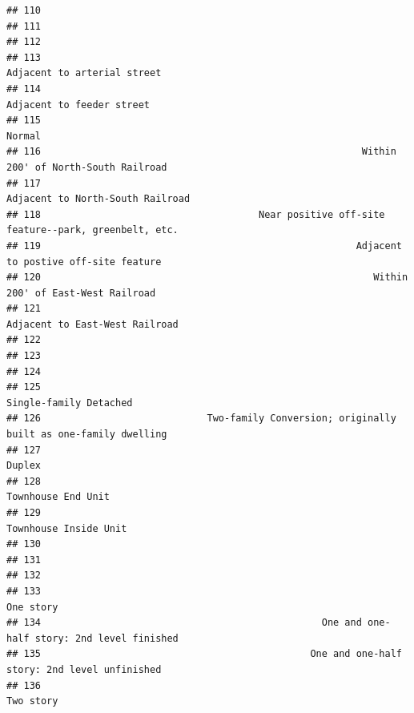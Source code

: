 \documentclass[
]{article}
\begin{document}
\begin{verbatim}
## 110                                                                                           
## 111                                                                                           
## 112                                                                                           
## 113                                                                Adjacent to arterial street
## 114                                                                  Adjacent to feeder street
## 115                                                                                     Normal
## 116                                                        Within 200' of North-South Railroad
## 117                                                           Adjacent to North-South Railroad
## 118                                      Near positive off-site feature--park, greenbelt, etc.
## 119                                                       Adjacent to postive off-site feature
## 120                                                          Within 200' of East-West Railroad
## 121                                                             Adjacent to East-West Railroad
## 122                                                                                           
## 123                                                                                           
## 124                                                                                           
## 125                                                                     Single-family Detached
## 126                             Two-family Conversion; originally built as one-family dwelling
## 127                                                                                     Duplex
## 128                                                                         Townhouse End Unit
## 129                                                                      Townhouse Inside Unit
## 130                                                                                           
## 131                                                                                           
## 132                                                                                           
## 133                                                                                  One story
## 134                                                 One and one-half story: 2nd level finished
## 135                                               One and one-half story: 2nd level unfinished
## 136                                                                                  Two story

\end{verbatim}
\end{document}

